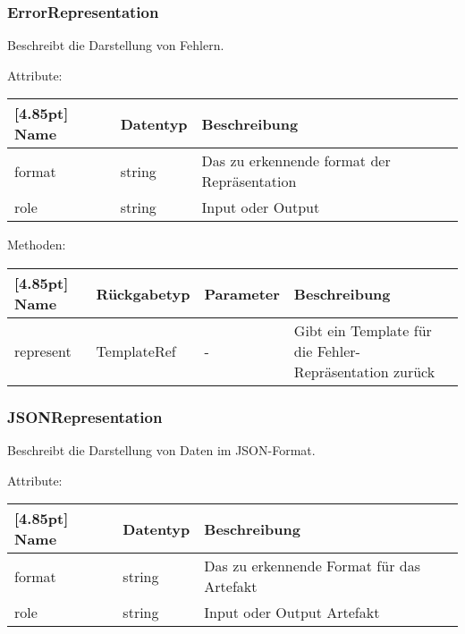 			\subsubsection{ErrorRepresentation}
			
			Beschreibt die Darstellung von Fehlern.\newline
			
				Attribute:
				\begin{center}
					\renewcommand{\arraystretch}{1.5}
					\setlength\tabcolsep{5pt}
					\begin{tabularx}{\textwidth}{|l|l|X|}
						\hline
						\rowcolor[gray]{0.75}[4.85pt]					
						Name & Datentyp & Beschreibung \\ \hline
						format & string & Das zu erkennende format der Repräsentation \\ \hline
						role & string & Input oder Output \\ \hline
					\end{tabularx}
				\end{center}
				
				Methoden:
				\begin{center}
				\setlength\tabcolsep{5pt}
					\renewcommand{\arraystretch}{1.5}
						\begin{tabularx}{\textwidth}{|l|l|l|X|}
						\hline
						\rowcolor[gray]{0.75}[4.85pt]
						Name & Rückgabetyp & Parameter & Beschreibung \\ \hline
						represent & TemplateRef & - & Gibt ein Template für die Fehler-Repräsentation zurück \\ \hline
						\end{tabularx}
				\end{center}
			
			\subsubsection{JSONRepresentation}
			
			Beschreibt die Darstellung von Daten im JSON-Format.\newline
			
				Attribute:
				\begin{center}
					\renewcommand{\arraystretch}{1.5}
					\setlength\tabcolsep{5pt}
					\begin{tabularx}{\textwidth}{|l|l|X|}
						\hline
						\rowcolor[gray]{0.75}[4.85pt]					
						Name & Datentyp & Beschreibung \\ \hline
						format & string & Das zu erkennende Format für das Artefakt \\ \hline
						role & string & Input oder Output Artefakt \\ \hline
					\end{tabularx}
				\end{center}
				
